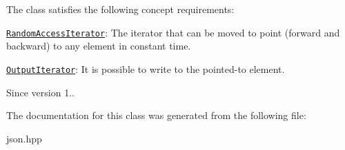 The class satisfies the following concept requirements\+:
\begin{DoxyItemize}
\item \href{http://en.cppreference.com/w/cpp/concept/RandomAccessIterator}{\tt Random\+Access\+Iterator}\+: The iterator that can be moved to point (forward and backward) to any element in constant time.
\item \href{http://en.cppreference.com/w/cpp/concept/OutputIterator}{\tt Output\+Iterator}\+: It is possible to write to the pointed-\/to element.
\end{DoxyItemize}

\begin{DoxySince}{Since}
version 1.. 
\end{DoxySince}


The documentation for this class was generated from the following file\+:\begin{DoxyCompactItemize}
\item 
json.\+hpp\end{DoxyCompactItemize}
